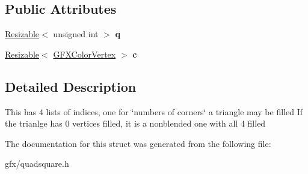 \subsection*{Public Attributes}
\begin{DoxyCompactItemize}
\item 
\hyperlink{classResizable}{Resizable}$<$ unsigned int $>$ {\bfseries q}\hypertarget{structTextureIndex_afabfcb99d1d63b68775d6424f81de8eb}{}\label{structTextureIndex_afabfcb99d1d63b68775d6424f81de8eb}

\item 
\hyperlink{classResizable}{Resizable}$<$ \hyperlink{structGFXColorVertex}{G\+F\+X\+Color\+Vertex} $>$ {\bfseries c}\hypertarget{structTextureIndex_a6119c21f3d9a6e88d051e6b6785838f3}{}\label{structTextureIndex_a6119c21f3d9a6e88d051e6b6785838f3}

\end{DoxyCompactItemize}


\subsection{Detailed Description}
This has 4 lists of indices, one for \char`\"{}numbers of corners\char`\"{} a triangle may be filled If the trianlge has 0 vertices filled, it is a nonblended one with all 4 filled 

The documentation for this struct was generated from the following file\+:\begin{DoxyCompactItemize}
\item 
gfx/quadsquare.\+h\end{DoxyCompactItemize}
